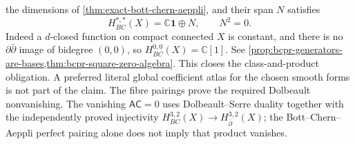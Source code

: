 \begin{auditrecord}
the dimensions of
\cref{thm:exact-bott-chern-aeppli}, and their span $N$ satisfies
\[
 H^{*,*}_{BC}(X)=\mathbb C\mathbf1\oplus N,\qquad N^2=0.
\]
Indeed a $d$-closed function on compact connected $X$ is constant, and there
is no $\partial\bar\partial$ image of bidegree $(0,0)$, so
$H^{0,0}_{BC}(X)=\mathbb C[1]$.
See
\cref{prop:bcpr-generators-are-bases,thm:bcpr-square-zero-algebra}.  This
closes the class-and-product obligation.  A preferred literal global
coefficient atlas for the chosen smooth forms is not part of the claim.
The fibre pairings prove the required Dolbeault nonvanishing.  The vanishing
$\mathsf A\mathsf C=0$ uses Dolbeault--Serre duality together with the
independently proved injectivity
$H^{3,2}_{BC}(X)\to H^{3,2}_{\bar\partial}(X)$; the
Bott--Chern--Aeppli perfect pairing alone does not imply that product
vanishes.
\end{auditrecord}
